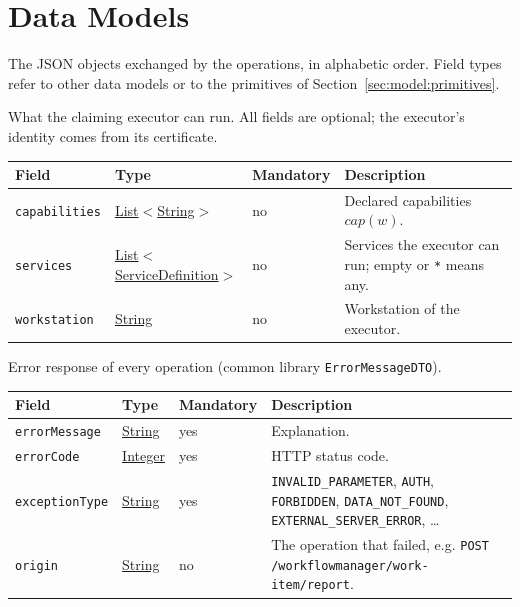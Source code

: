 \documentclass[a4paper]{arrowhead}
\newcommand{\pref}[1]{{\textcolor{ArrowheadGrey}{\hyperref[sec:model:primitives:#1]{#1}}}}
\begin{document}
\newpage
\section{Data Models}
\label{sec:model}
The JSON objects exchanged by the operations, in alphabetic order. Field types refer to other data models or to the
primitives of Section~\ref{sec:model:primitives}.

What the claiming executor can run. All fields are optional; the executor's identity comes from its certificate.

{\small
\begin{longtable}{|p{3.7cm}|p{4.2cm}|p{1.6cm}|p{6.3cm}|}

\hline
\rowcolor{gray!33} Field & Type & Mandatory & Description \\ \hline
\endhead
\texttt{capabilities} & \pref{List}$<$\pref{String}$>$ & no & Declared capabilities $cap(w)$. \\ \hline
\texttt{services} & \pref{List}$<$\pref{ServiceDefinition}$>$ & no & Services the executor can run; empty or \texttt{*} means any. \\ \hline
\texttt{workstation} & \pref{String} & no & Workstation of the executor. \\ \hline
\end{longtable}
}

Error response of every operation (common library \texttt{Error\allowbreak{}MessageDTO}).

{\small
\begin{longtable}{|p{3.7cm}|p{4.2cm}|p{1.6cm}|p{6.3cm}|}

\hline
\rowcolor{gray!33} Field & Type & Mandatory & Description \\ \hline
\endhead
\texttt{errorMessage} & \pref{String} & yes & Explanation. \\ \hline
\texttt{errorCode} & \pref{Integer} & yes & HTTP status code. \\ \hline
\texttt{exceptionType} & \pref{String} & yes & \texttt{INVALID\_\allowbreak{}PARAMETER}, \texttt{AUTH}, \texttt{FORBIDDEN}, \texttt{DATA\_\allowbreak{}NOT\_\allowbreak{}FOUND}, \texttt{EXTERNAL\_\allowbreak{}SERVER\_\allowbreak{}ERROR}, \ldots \\ \hline
\texttt{origin} & \pref{String} & no & The operation that failed, e.g. \texttt{POST /\allowbreak{}workflowmanager/\allowbreak{}work-\allowbreak{}item/\allowbreak{}report}. \\ \hline
\end{longtable}
}
\end{document}
